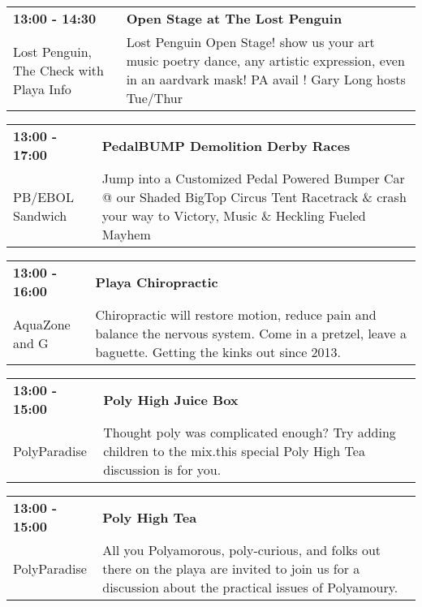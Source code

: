 \begin{tabular}{ p{1in} p{2.2in} }
    \textbf{13:00 - 14:30} & \textbf{Open Stage at The Lost Penguin} \\
    Lost Penguin, The \newline  Check with Playa Info & Lost Penguin Open Stage! show us your art music poetry dance, any artistic expression, even in an aardvark mask! PA avail !  Gary Long hosts Tue/Thur \\
    \hline 
\end{tabular}
    
\begin{tabular}{ p{1in} p{2.2in} }
    \textbf{13:00 - 17:00} & \textbf{PedalBUMP Demolition Derby Races} \\
    PB/EBOL Sandwich \newline  & Jump into a Customized Pedal Powered Bumper Car @ our Shaded BigTop Circus Tent Racetrack \& crash your way to Victory, Music \& Heckling Fueled Mayhem \\
    \hline 
\end{tabular}
    
\begin{tabular}{ p{1in} p{2.2in} }
    \textbf{13:00 - 16:00} & \textbf{Playa Chiropractic} \\
    AquaZone \newline 3 and G & Chiropractic will restore motion, reduce pain and balance the nervous system.  Come in a pretzel, leave a baguette. Getting the kinks out since 2013. \\
    \hline 
\end{tabular}
    
\begin{tabular}{ p{1in} p{2.2in} }
    \textbf{13:00 - 15:00} & \textbf{Poly High Juice Box} \\
    PolyParadise \newline  & Thought poly was complicated enough? Try adding children to the mix.this special Poly High Tea discussion is for you. \\
    \hline 
\end{tabular}
    
\begin{tabular}{ p{1in} p{2.2in} }
    \textbf{13:00 - 15:00} & \textbf{Poly High Tea} \\
    PolyParadise \newline  & All you Polyamorous, poly-curious, and folks out there on the playa are invited to join us for a discussion about the practical issues of Polyamoury. \\
    \hline 
\end{tabular}
    
